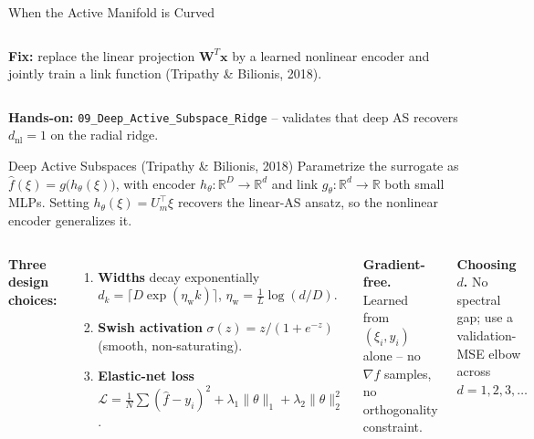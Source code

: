 \documentclass[aspectratio=169,11pt]{beamer}
\newcommand{\emphc}[1]{\textcolor{harvardcrimson}{#1}}
\newcommand{\x}{\bm{x}}
\newcommand{\W}{\bm{W}}
\newcommand{\R}{\mathbb{R}}
\begin{document}
\begin{frame}{When the Active Manifold is Curved}
\begin{columns}[T]
\vspace{0.2em}
\textbf{Fix:} replace the linear projection $\W^T \x$ by a \emphc{learned nonlinear encoder} and jointly train a link function (Tripathy \& Bilionis, 2018).
\end{columns}

\vspace{0.1em}
{\tiny \textbf{Hands-on:} \texttt{09\_Deep\_Active\_Subspace\_Ridge} -- validates that deep AS recovers $d_{\mathrm{nl}} = 1$ on the radial ridge.}
\end{frame}

\begin{frame}{Deep Active Subspaces (Tripathy \& Bilionis, 2018)}
\scriptsize
Parametrize the surrogate as $\hat f(\xi) = g\bigl(h_\theta(\xi)\bigr)$, with \emphc{encoder} $h_\theta: \R^D \to \R^d$ and \emphc{link} $g_\theta: \R^d \to \R$ both small MLPs.  Setting $h_\theta(\xi) = U_m^\top \xi$ recovers the linear-AS ansatz, so the nonlinear encoder generalizes it.

\vspace{0.3em}
\begin{columns}[T]
\textbf{Three design choices:}
\begin{enumerate}\itemsep1pt
  \item \textbf{Widths} decay exponentially
  $d_k = \lceil D \exp(\eta_{\mathrm{w}} k)\rceil$, $\eta_{\mathrm{w}} = \tfrac{1}{L}\log(d/D)$.
  \item \textbf{Swish activation} $\sigma(z) = z/(1 + e^{-z})$ (smooth, non-saturating).
  \item \textbf{Elastic-net loss}
  $\mathcal L = \tfrac{1}{N}\sum(\hat f - y_i)^2 + \lambda_1\|\theta\|_1 + \lambda_2\|\theta\|_2^2$.
\end{enumerate}

\vspace{0.3em}
\textbf{Gradient-free.} Learned from $(\xi_i, y_i)$ alone -- no $\nabla f$ samples, no orthogonality constraint.

\vspace{0.2em}
\textbf{Choosing $d$.} No spectral gap; use a \emphc{validation-MSE elbow} across $d = 1, 2, 3, \ldots$


\end{columns}
\end{frame}
\end{document}
